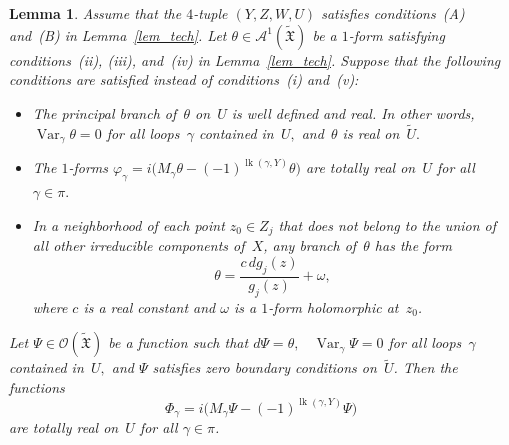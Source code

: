 \documentclass[reqno,tbtags,12pt]{amsart}
\numberwithin{equation}{section}
\newcommand{\tFX}{\widetilde{\mathfrak{X}}}
\newcommand{\CO}{\mathcal{O}}
\newcommand{\A}{\mathcal{A}}
\newcommand{\tU}{\widetilde{U}}
\newcommand{\lk}{\mathop{\mathrm{lk}}\nolimits}
\newcommand{\Var}{\mathop{\mathrm{Var}}\nolimits}
\newtheorem{lem}[theorem]{Lemma}
\theoremstyle{definition}
\begin{document}
 



\begin{lem}\label{lem_tech2}
Assume that  the $4$-tuple $(Y,Z,W,U)$ satisfies conditions~\textnormal{(A)} and~\textnormal{(B)} in Lemma~\ref{lem_tech}. Let  $\theta\in\A^1(\tFX)$ be a $1$-form satisfying conditions~\textnormal{(ii), (iii),} and\/~\textnormal{(iv)} in Lemma~\ref{lem_tech}. Suppose that the following conditions are satisfied instead of conditions~\textnormal{(i)} and~\textnormal{(v):} 
\begin{itemize}
\item[\textnormal{(i${}'$)}] The principal branch of~$\theta$ on~$U$ is well defined and real. In other words, $\Var_{\gamma}\theta=0$ for all loops~$\gamma$ contained in~$U,$ and~$\theta$ is real on~$\tU.$
\item[\textnormal{(i${}''$)}] The $1$-forms $\varphi_{\gamma}=i\bigl(M_{\gamma}\theta-(-1)^{\lk(\gamma,Y)}\theta\bigr)$ are totally real on~$U$ for all $\gamma\in\pi.$ 
\item[\textnormal{(v${}'$)}] In a neighborhood of each point $z_0\in Z_j$ that does not belong to the union of all other irreducible components of~$X$, any branch of\/~$\theta$ has the form
\begin{equation}\label{eq_omega3}
\theta=\frac{c\,dg_j(z)}{g_j(z)}+\omega,
\end{equation}
where $c$ is a real constant and\/ $\omega$ is a $1$-form holomorphic at~$z_0$.
\end{itemize}
Let $\Psi\in\CO(\tFX)$ be a function such that $d\Psi=\theta,$ \ $\Var_{\gamma}\Psi=0$ for all loops~$\gamma$ contained in~$U,$ and $\Psi$ satisfies zero boundary conditions on~$\tU$. Then the functions
$$\Phi_{\gamma}=i\bigl(M_{\gamma}\Psi-(-1)^{\lk(\gamma,Y)}\Psi\bigr)$$
are totally real on~$U$ for all $\gamma\in\pi$.
\end{lem}
\end{document}
